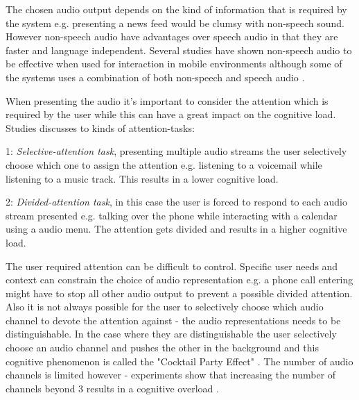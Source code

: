 The chosen audio output depends on the kind of information that is required by the system e.g. presenting a news feed would be clumsy with non-speech sound. However non-speech audio have advantages over speech audio in that they are faster and language independent. Several studies have shown non-speech audio to be effective when used for interaction in mobile environments although some of the systems uses a combination of both non-speech and speech audio \cite{pirhonen_gestural_2002, sawhney_nomadic_2000, brewster_using_2000}.

When presenting the audio it's important to consider the attention which is required by the user while this can have a great impact on the cognitive load. Studies \cite{vazquez-alvarez_eyes-free_2011, shinn-cunningham_selective_2004} discusses to kinds of attention-tasks:

\begin{description}
\item{1: \textit{Selective-attention task}}, presenting multiple audio streams the user selectively choose which one to assign the attention e.g. listening to a voicemail while listening to a music track. This results in a lower cognitive load.

\item{2: \textit{Divided-attention task}}, in this case the user is forced to respond to each audio stream presented e.g. talking over the phone while interacting with a calendar using a audio menu. The attention gets divided and results in a higher cognitive load.
\end{description}

The user required attention can be difficult to control. Specific user needs and context can constrain the choice of audio representation e.g. a phone call entering might have to stop all other audio output to prevent a possible divided attention. Also it is not always possible for the user to selectively choose which audio channel to devote the attention against - the audio representations needs to be distinguishable. In the case where they are distinguishable the user selectively choose an audio channel and pushes the other in the background and this cognitive phenomenon is called the "Cocktail Party Effect" \cite{bronkhorst_cocktail_2000}. The number of audio channels is limited however - experiments show that increasing the number of channels beyond 3 results in a cognitive overload \cite{bronkhorst_cocktail_2000}.

